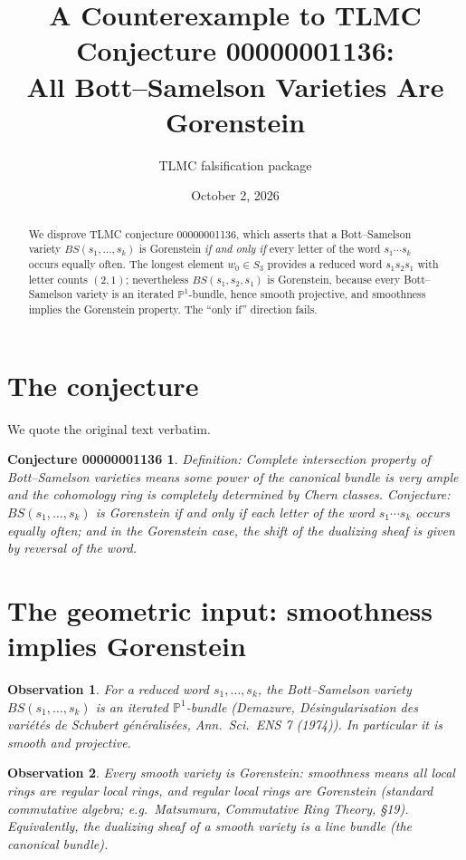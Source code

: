 \documentclass[11pt]{article}
\title{A Counterexample to TLMC Conjecture 00000001136:\\
All Bott--Samelson Varieties Are Gorenstein}
\author{TLMC falsification package}
\date{October 2, 2026}
\newtheorem*{conj*}{Conjecture 00000001136}
\newtheorem{obs}{Observation}
\begin{document}
\maketitle

\begin{abstract}
We disprove TLMC conjecture 00000001136, which asserts that a Bott--Samelson
variety $BS(s_1,\dots,s_k)$ is Gorenstein \emph{if and only if} every letter of
the word $s_1\cdots s_k$ occurs equally often.  The longest element
$w_0 \in S_3$ provides a reduced word $s_1s_2s_1$ with letter counts $(2,1)$;
nevertheless $BS(s_1,s_2,s_1)$ is Gorenstein, because every Bott--Samelson
variety is an iterated $\mathbb{P}^1$-bundle, hence smooth projective, and
smoothness implies the Gorenstein property.  The ``only if'' direction fails.
\end{abstract}

\section{The conjecture}

We quote the original text verbatim.

\begin{conj*}
\emph{Definition:} Complete intersection property of Bott--Samelson varieties
means some power of the canonical bundle is very ample and the cohomology ring
is completely determined by Chern classes.
\emph{Conjecture:} $BS(s_1,\dots,s_k)$ is Gorenstein if and only if each letter
of the word $s_1\cdots s_k$ occurs equally often; and in the Gorenstein case,
the shift of the dualizing sheaf is given by reversal of the word.
\end{conj*}

\section{The geometric input: smoothness implies Gorenstein}

\begin{obs}
For a reduced word $s_1,\dots,s_k$, the Bott--Samelson variety
$BS(s_1,\dots,s_k)$ is an iterated $\mathbb{P}^1$-bundle (Demazure,
\emph{D\'esingularisation des vari\'et\'es de Schubert g\'en\'eralis\'ees},
Ann.\ Sci.\ ENS 7 (1974)).  In particular it is smooth and projective.
\end{obs}

\begin{obs}
Every smooth variety is Gorenstein: smoothness means all local rings are
regular local rings, and regular local rings are Gorenstein (standard
commutative algebra; e.g.\ Matsumura, \emph{Commutative Ring Theory}, \S19).
Equivalently, the dualizing sheaf of a smooth variety is a line bundle (the
canonical bundle).
\end{obs}
\end{document}
